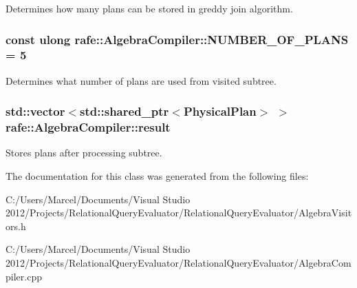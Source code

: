 Determines how many plans can be stored in greddy join algorithm. \hypertarget{classrafe_1_1_algebra_compiler_afe381cc19b6dc860178b4a8783b51237}{
\subsubsection[{N\+U\+M\+B\+E\+R\+\_\+\+O\+F\+\_\+\+P\+L\+A\+N\+S}]{\setlength{\rightskip}{0pt plus 5cm}const ulong rafe\+::\+Algebra\+Compiler\+::\+N\+U\+M\+B\+E\+R\+\_\+\+O\+F\+\_\+\+P\+L\+A\+N\+S = 5\hspace{0.3cm}{\ttfamily [static]}}}\label{classrafe_1_1_algebra_compiler_afe381cc19b6dc860178b4a8783b51237}
Determines what number of plans are used from visited subtree. \hypertarget{classrafe_1_1_algebra_compiler_a10ef60b632a1f593c0bbe3bbf5c3263c}{
\subsubsection[{result}]{\setlength{\rightskip}{0pt plus 5cm}std\+::vector$<$std\+::shared\+\_\+ptr$<${\bf Physical\+Plan}$>$ $>$ rafe\+::\+Algebra\+Compiler\+::result}}\label{classrafe_1_1_algebra_compiler_a10ef60b632a1f593c0bbe3bbf5c3263c}
Stores plans after processing subtree. 

The documentation for this class was generated from the following files\+:\begin{DoxyCompactItemize}
\item 
C\+:/\+Users/\+Marcel/\+Documents/\+Visual Studio 2012/\+Projects/\+Relational\+Query\+Evaluator/\+Relational\+Query\+Evaluator/Algebra\+Visitors.\+h\item 
C\+:/\+Users/\+Marcel/\+Documents/\+Visual Studio 2012/\+Projects/\+Relational\+Query\+Evaluator/\+Relational\+Query\+Evaluator/Algebra\+Compiler.\+cpp\end{DoxyCompactItemize}

